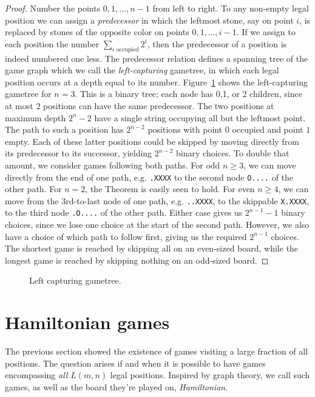\documentclass{article}
\begin{document}
\begin{proof}
Number the points $0,1,\ldots,n-1$ from left to right.
To any non-empty legal position we can assign a {\em predecessor}
in which the leftmost stone, say on point $i$, is replaced by
stones of the opposite color on points $0,1,\ldots,i-1$.
If we assign to each position the number $\sum_{i\mbox{ occupied}} 2^i$,
then the predecessor of a position is indeed numbered one less.
The predecessor relation defines a spanning tree of the game graph which we
call the {\em left-capturing} gametree, in which each legal
position occurs at a depth equal to its number. Figure~\ref{leftcap}
shows the left-capturing gametree for $n=3$.
This is a binary tree; each node has 0,1, or 2 children, since at most
2 positions can have the same predecessor.
The two positions at maximum depth $2^n-2$ have a single string
occupying all but the leftmost point. The path to such a position has
$2^{n-2}$ positions with point $0$ occupied and point $1$ empty.
Each of these latter positions could be skipped by moving directly
from its predecessor to its successor, yielding $2^{n-2}$ binary choices.
To double that amount, we consider games following both paths.
For odd $n\geq 3$, we can move directly
from the end of one path, e.g. {\tt .XXXX} to the second node {\tt O....}
of the other path.
For $n=2$, the Theorem is easily seen to hold.
For even $n \geq 4$, we can move from the 3rd-to-last node of one path,
e.g. {\tt ..XXXX}, to the skippable {\tt X.XXXX},
to the third node {\tt .O....} of the other path.
Either case gives us $2^{n-1}-1$ binary choices, since we lose
one choice at the start of the second path.
However, we also have a choice of which path to follow first,
giving us the required $2^{n-1}$ choices. The
shortest game is reached by skipping all on an even-sized board,
while the longest game is reached by skipping nothing on an odd-sized board.
\end{proof}

\begin{figure}
\begin{center}
\epsfxsize=9cm 
\end{center}
\caption{Left capturing gametree.}
\label{leftcap}
\end{figure}

\section{Hamiltonian games}
The previous section showed the existence of games visiting a large
fraction of all positions. The question arises if and when it
is possible to have games encompassing {\em all} $L(m,n)$ legal
positions.
Inspired by graph theory, we call such games, as well as
the board they're played on, {\em Hamiltonian}.
\end{document}
